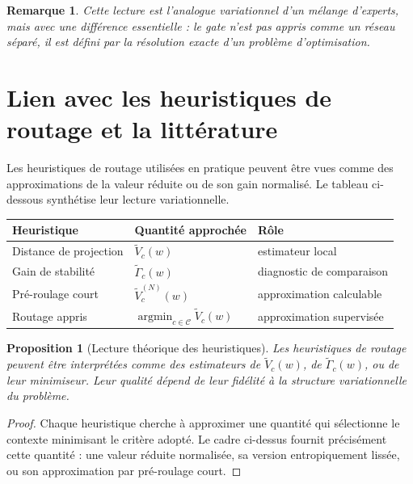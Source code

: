 \documentclass[11pt,a4paper]{article}
\newtheorem{proposition}{Proposition}[section]
\newtheorem{remark}{Remarque}[section]
\DeclareMathOperator{\argmin}{argmin}
\newcommand{\Ccal}{\mathcal C}
\begin{document}
\begin{remark}
Cette lecture est l'analogue variationnel d'un mélange d'experts, mais avec une différence essentielle : le gate n'est pas appris comme un réseau séparé, il est défini par la résolution exacte d'un problème d'optimisation.
\end{remark}

\section{Lien avec les heuristiques de routage et la littérature}

Les heuristiques de routage utilisées en pratique peuvent être vues comme des approximations de la valeur réduite ou de son gain normalisé. Le tableau ci-dessous synthétise leur lecture variationnelle.

\begin{center}
\begin{tabular}{@{}lll@{}}
\toprule
Heuristique & Quantité approchée & Rôle \\ \midrule
Distance de projection & \(\widetilde V_c(w)\) & estimateur local \\
Gain de stabilité & \(\widetilde\Gamma_c(w)\) & diagnostic de comparaison \\
Pré-roulage court & \(\widetilde V_c^{(N)}(w)\) & approximation calculable \\
Routage appris & \(\argmin_{c\in\Ccal}\widetilde V_c(w)\) & approximation supervisée \\ \bottomrule
\end{tabular}
\end{center}

\begin{proposition}[Lecture théorique des heuristiques]
Les heuristiques de routage peuvent être interprétées comme des estimateurs de \(\widetilde V_c(w)\), de \(\widetilde\Gamma_c(w)\), ou de leur minimiseur. Leur qualité dépend de leur fidélité à la structure variationnelle du problème.
\end{proposition}

\begin{proof}
Chaque heuristique cherche à approximer une quantité qui sélectionne le contexte minimisant le critère adopté. Le cadre ci-dessus fournit précisément cette quantité : une valeur réduite normalisée, sa version entropiquement lissée, ou son approximation par pré-roulage court.
\end{proof}
\end{document}
